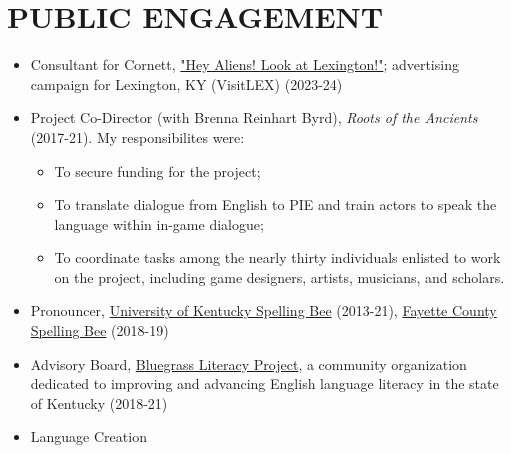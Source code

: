 \documentclass[paper=letter,fontsize=11pt]{scrartcl} %
\newcommand{\NewPart}[2]{\section*{\uppercase{#1} #2}}
\begin{document}
\NewPart{Public Engagement}{}
\begin{itemize}

\item Consultant for Cornett, \href{https://www.visitlex.com/aliens/}{"Hey Aliens! Look at Lexington!"}; advertising campaign for Lexington, KY (VisitLEX) (2023-24)

\item Project Co-Director (with Brenna Reinhart Byrd), \textit{Roots of the Ancients} (2017-21). My responsibilites were:

\begin{itemize}
    \item To secure funding for the  project;
    \item To translate dialogue from English to PIE and train actors to speak the language within in-game dialogue;
    \item To coordinate tasks among the nearly thirty individuals enlisted to work on the project, including game designers, artists, musicians, and scholars.
\end{itemize}
\item Pronouncer,  \href{https://ci.uky.edu/jam/scripps-howard-first-amendment-center}{University of Kentucky Spelling Bee} (2013-21), \href{http://www.fayettecofarmbureau.com/2018-fayette-county-farm-bureau-spelling-bee/}{Fayette County Spelling Bee} (2018-19)

\item Advisory Board, \href{https://thewordexplorer.blog/2018/01/10/bluegrass-literacy-project/}{Bluegrass Literacy Project}, a community organization dedicated to improving and advancing English language literacy in the state of Kentucky (2018-21)

\item{Language Creation}
\end{itemize}
\end{document}
